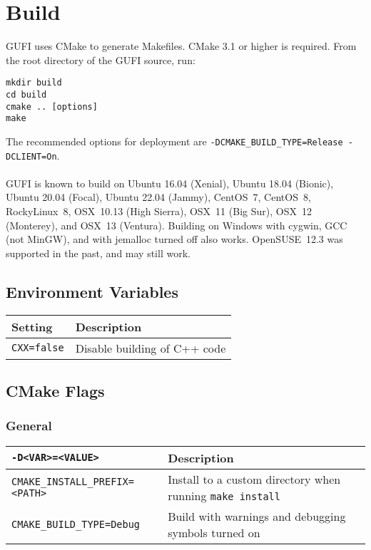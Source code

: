 \section{Build}

GUFI uses CMake to generate Makefiles. CMake 3.1 or higher is
required. From the root directory of the GUFI source, run:
\begin{verbatim}
mkdir build
cd build
cmake .. [options]
make
\end{verbatim}

The recommended options for deployment are
\texttt{-DCMAKE\_BUILD\_TYPE=Release -DCLIENT=On}.
\\\\
GUFI is known to build on Ubuntu 16.04 (Xenial), Ubuntu 18.04
(Bionic), Ubuntu 20.04 (Focal), Ubuntu 22.04 (Jammy), CentOS~7,
CentOS~8, RockyLinux~8, OSX~10.13 (High Sierra), OSX~11 (Big Sur),
OSX~12 (Monterey), and OSX~13 (Ventura). Building on Windows with
cygwin, GCC (not MinGW), and with jemalloc turned off also works.
OpenSUSE~12.3 was supported in the past, and may still work.

\subsection{Environment Variables}
\begin{table}[h!]
\centering
\begin{tabularx}{1.2\textwidth}{| l | X |}
  \hline
  Setting & Description \\
  \hline
  \texttt{CXX=false} & Disable building of C++ code \\
  \hline
\end{tabularx}
\end{table}

\subsection{CMake Flags}

\subsubsection{General}
\begin{table}[h!]
\centering
\begin{tabularx}{1.2\textwidth}{| l | X |}
  \hline
  \texttt{-D<VAR>=<VALUE>} & Description \\
  \hline
  \texttt{CMAKE\_INSTALL\_PREFIX=<PATH>}
  & Install to a custom directory when running \texttt{make install} \\
  \hline
  \texttt{CMAKE\_BUILD\_TYPE=Debug}
  & Build with warnings and debugging symbols turned on \\
  \hline
\end{tabularx}
\end{table}

